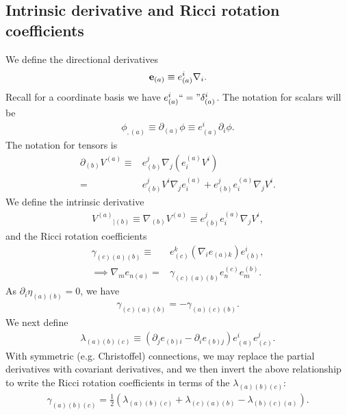 \documentclass[12pt]{report}
\begin{document}
\subsection{Intrinsic derivative and Ricci rotation coefficients}
	We define the directional derivatives
\begin{align}
	{\bf e}_{(a)}
	\equiv
	e_{(a)}^i\nabla_i
	.
\end{align}
	Recall for a coordinate basis we have $e^i_{(a)}``="\delta^i_{(a)}$.
The notation for scalars will be 
\begin{align}
	\phi_{,(a)}
	\equiv
	\partial_{(a)}\phi
	\equiv
	e_{(a)}^i\partial_i\phi
	.
\end{align}
	The notation for tensors is
\begin{align}
	\partial_{(b)}V^{(a)}
	\equiv &
	e^j_{(b)}\nabla_j\left(e^{(a)}_iV^i\right)
	\nonumber \\
	= &
	e^j_{(b)} V^i\nabla_je^{(a)}_{i}
+	e^j_{(b)}e^{(a)}_i\nabla_jV^i
	.
\end{align}
	We define the intrinsic derivative
\begin{align}
\label{eq:def_intrinsic_der}
	V^{(a)}{}_{|(b)}
	\equiv
	\nabla_{(b)}V^{(a)}
	\equiv
	e^j_{(b)}e^{(a)}_i\nabla_jV^i
	,	
\end{align}
	and the Ricci rotation coefficients
\begin{align}
\label{eq:def_Ricci_rotation}
	\gamma_{{(c)}{(a)}{(b)}}
	\equiv &
	e_{(c)}^k \left(\nabla_ie_{{(a)}k}\right) e_{(b)}^i
	, \\
\implies \nabla_me_{n(a)}
	= &
	\gamma_{(c)(a)(b)}e^{(c)}_ne^{(b)}_m
	. 
\end{align}
	As $\partial_i\eta_{{(a)}{(b)}}=0$, we have
\begin{align}
	\gamma_{{(c)}{(a)}{(b)}}
	=
-	\gamma_{{(a)}{(c)}{(b)}}
	.
\end{align}
	We next define	
\begin{align}
\label{eq:def_lambda_coef}
	\lambda_{{(a)}{(b)}{(c)}}
	\equiv
	\left(
		\partial_je_{{(b)}i}
	-	\partial_ie_{{(b)}j}
	\right)
	e^i_{(a)}e^j_{(c)}
	.
\end{align}
	With symmetric (e.g. Christoffel)
connections, we may replace the partial derivatives with
covariant derivatives, and we then invert the above relationship
to write the Ricci rotation coefficients in terms
of the $\lambda_{(a)(b)(c)}$:
\begin{align}
	\gamma_{(a)(b)(c)}
	=
	\frac{1}{2}\left(
		\lambda_{(a)(b)(c)}
	+	\lambda_{(c)(a)(b)}
	-	\lambda_{(b)(c)(a)}
	\right)
	.
\end{align} 
\end{document}
